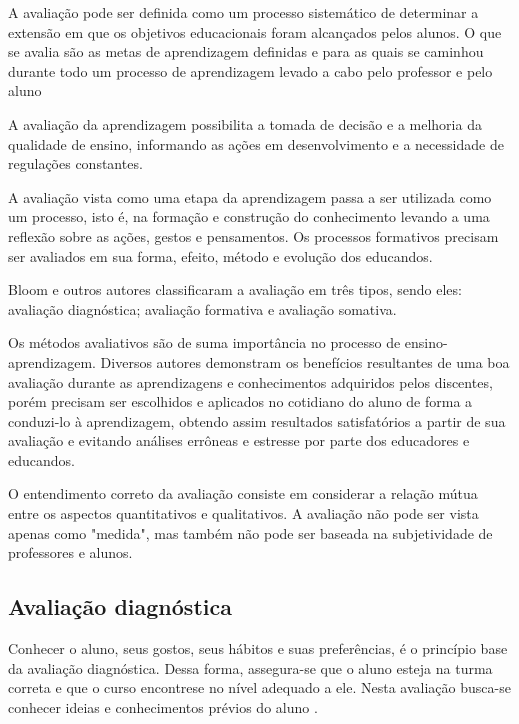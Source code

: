 \documentclass[
	12pt,				%
	openright,			%
	oneside,
	a4paper,			%
	english,			%
	french,				%
	spanish,			%
	brazil,				%
	]{abntex2}
\begin{document}
A avaliação pode ser definida como um processo sistemático de determinar a extensão em que os objetivos educacionais foram alcançados pelos alunos. O que se avalia são as metas de aprendizagem definidas e para as quais se caminhou durante todo um processo de aprendizagem levado a cabo pelo professor e pelo aluno \cite{domingos1981forma}

A avaliação da aprendizagem possibilita a tomada de decisão e a melhoria da qualidade de ensino, informando as ações em desenvolvimento e a necessidade de regulações constantes. \cite{kraemer2005avaliaccao}

A avaliação vista como uma etapa da aprendizagem passa a ser utilizada como um processo, isto é, na formação e construção do conhecimento levando a uma reflexão sobre as ações, gestos e pensamentos. Os processos formativos precisam ser avaliados em sua forma, efeito, método e evolução dos educandos. \cite{datrino2015avaliaccao}

Bloom e outros autores classificaram a avaliação em três tipos, sendo eles:
avaliação diagnóstica; avaliação formativa e avaliação somativa. \cite{bloom1983manual}

Os métodos avaliativos são de suma importância no processo de ensino-aprendizagem. Diversos autores demonstram os benefícios resultantes de uma boa avaliação durante as aprendizagens e conhecimentos adquiridos pelos discentes, porém precisam ser escolhidos e aplicados no cotidiano do aluno de forma a conduzi-lo à aprendizagem, obtendo assim resultados satisfatórios a partir de sua avaliação e evitando análises errôneas e estresse por parte dos educadores e educandos. \cite{da2014alunos}

O entendimento correto da avaliação consiste em considerar a relação mútua entre os aspectos quantitativos e qualitativos. A avaliação não pode ser vista apenas como "medida", mas também não pode ser baseada na subjetividade de professores e alunos. \cite{libaneo1994didatica}

\subsection{Avaliação diagnóstica}
\label{sec:AvaDiag}
Conhecer o aluno, seus gostos, seus hábitos e suas preferências, é o princípio base da avaliação diagnóstica. Dessa forma, assegura-se que o aluno esteja na turma correta e que o curso encontrese no nível adequado a ele. Nesta avaliação busca-se conhecer ideias e conhecimentos prévios do aluno \cite{masetto1994didatica}.
\end{document}
